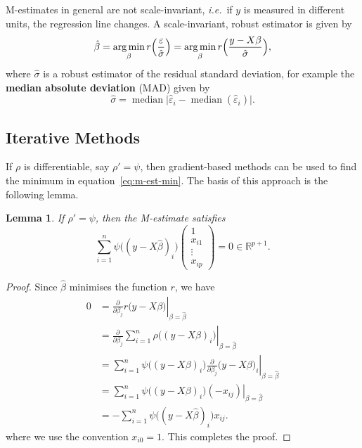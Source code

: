 \documentclass[
  a4paper,
]{article}
\newtheorem{lemma}{Lemma}[section]
\theoremstyle{definition}
\theoremstyle{definition}
\theoremstyle{definition}
\theoremstyle{definition}
\theoremstyle{remark}
\begin{document}
M-estimates in general are not scale-invariant, \emph{i.e.}~if \(y\) is measured
in different units, the regression line changes. A scale-invariant, robust
estimator is given by
\begin{equation*}
  \hat\beta
  = \mathop{\mathrm{arg\,min}}\limits_\beta r\Bigl( \frac{\varepsilon}{\hat\sigma} \Bigr)
  = \mathop{\mathrm{arg\,min}}\limits_\beta r\Bigl( \frac{y - X\beta}{\hat\sigma} \Bigr),
\end{equation*}
where \(\hat \sigma\) is a robust estimator of the residual standard deviation,
for example the \textbf{median absolute deviation} (MAD) given by
\begin{equation*}
  \hat\sigma
  = \mathop{\mathrm{median}}\bigl| \hat\varepsilon_i - \mathop{\mathrm{median}}(\hat\varepsilon_i) \bigr|.
\end{equation*}

\subsection{Iterative Methods}\label{iterative-methods}

If \(\rho\) is differentiable, say \(\rho' = \psi\), then gradient-based methods
can be used to find the minimum in equation~\eqref{eq:m-est-min}. The basis of
this approach is the following lemma.

\begin{lemma}
If \(\rho' = \psi\), then the M-estimate satisfies
\begin{equation}
  \sum_{i=1}^n \psi\bigl( (y - X\hat\beta)_i \bigr)
    \begin{pmatrix}
      1 \\ x_{i1} \\ \vdots \\ x_{ip}
    \end{pmatrix}
  = 0 \in \mathbb{R}^{p+1}.  \label{eq:psi-root}
\end{equation}
\end{lemma}

\begin{proof}
Since \(\hat\beta\) minimises the function \(r\), we have
\begin{align*}
  0
  &= \left. \frac{\partial}{\partial\beta_j} r\bigl( y - X\beta \bigr) \right|_{\beta=\hat\beta} \\
  &= \left. \frac{\partial}{\partial\beta_j} \sum_{i=1}^n \rho\bigl( (y - X\beta)_i \bigr) \right|_{\beta=\hat\beta} \\
  &= \left. \sum_{i=1}^n \psi\bigl( (y - X\beta)_i \bigr) \frac{\partial}{\partial\beta_j} \bigl( y - X\beta \bigr)_i \right|_{\beta=\hat\beta} \\
  &= \left. \sum_{i=1}^n \psi\bigl( (y - X\beta)_i \bigr) (-x_{ij}) \right|_{\beta=\hat\beta} \\
  &= - \sum_{i=1}^n \psi\bigl( (y - X\hat\beta)_i \bigr) x_{ij}.
\end{align*}
where we use the convention \(x_{i0} = 1\). This completes the proof.
\end{proof}
\end{document}
